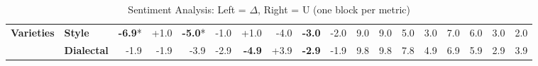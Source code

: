 \begin{table}[h]
{\begin{tabular}{llrrrrrrrrrrrrrrrr}
\midrule
\textbf{Varieties} & \textbf{Style} & \cellcolor{red!13} \textbf{-6.9}* & \cellcolor{green!1} +1.0 & \cellcolor{red!9} \textbf{-5.0}* & \cellcolor{red!1} -1.0 & \cellcolor{green!1} +1.0 & \cellcolor{red!7} -4.0 & \cellcolor{red!5} \textbf{-3.0} & \cellcolor{red!3} -2.0 & \cellcolor{blue!23} 9.0 & \cellcolor{blue!23} 9.0 & \cellcolor{blue!13} 5.0 & \cellcolor{blue!8} 3.0 & \cellcolor{blue!18} 7.0 & \cellcolor{blue!15} 6.0 & \cellcolor{blue!8} 3.0 & \cellcolor{blue!5} 2.0 \\
  & \textbf{Dialectal} & \cellcolor{red!3} -1.9 & \cellcolor{red!3} -1.9 & \cellcolor{red!7} -3.9 & \cellcolor{red!5} -2.9 & \cellcolor{red!9} \textbf{-4.9} & \cellcolor{green!7} +3.9 & \cellcolor{red!5} \textbf{-2.9} & \cellcolor{red!3} -1.9 & \cellcolor{blue!25} 9.8 & \cellcolor{blue!25} 9.8 & \cellcolor{blue!20} 7.8 & \cellcolor{blue!13} 4.9 & \cellcolor{blue!18} 6.9 & \cellcolor{blue!15} 5.9 & \cellcolor{blue!8} 2.9 & \cellcolor{blue!10} 3.9 \\
\bottomrule
\end{tabular}}
\caption{Sentiment Analysis: Left = $\Delta$, Right = U (one block per metric)}\label{tab:sa_dual}
\end{table}